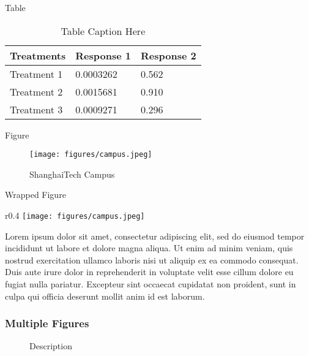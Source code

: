 \documentclass[aspectratio=169,xcolor=dvipsnames, t]{beamer}
\begin{document}
\begin{frame}{Table}
    \begin{table}
        \begin{tabular}{l l l}
            \toprule
            \textbf{Treatments} & \textbf{Response 1} & \textbf{Response 2} \\
            \midrule
            Treatment 1         & 0.0003262           & 0.562               \\
            Treatment 2         & 0.0015681           & 0.910               \\
            Treatment 3         & 0.0009271           & 0.296               \\
            \bottomrule
        \end{tabular}
        \caption{Table Caption Here}
    \end{table}
\end{frame}
\begin{frame}{Figure}
    \begin{figure}
    \texttt{[image: figures/campus.jpeg]}
    \caption{ShanghaiTech Campus}
    \end{figure}
\end{frame}
\begin{frame}{Wrapped Figure}
    \begin{wrapfigure}{r}{0.4\textwidth}
    \centering
    \texttt{[image: figures/campus.jpeg]}
    \caption{Figure Caption Here}
    \end{wrapfigure}
    Lorem ipsum dolor sit amet, consectetur adipiscing elit, sed do eiusmod tempor incididunt ut labore et dolore magna aliqua. Ut enim ad minim veniam, quis nostrud exercitation ullamco laboris nisi ut aliquip ex ea commodo consequat. Duis aute irure dolor in reprehenderit in voluptate velit esse cillum dolore eu fugiat nulla pariatur. Excepteur sint occaecat cupidatat non proident, sunt in culpa qui officia deserunt mollit anim id est laborum.
\end{frame}
\begin{frame}[fragile]
    \frametitle{Multiple Figures}
    \begin{figure}[H]
        \centering
        \hspace{1em}
        \caption{Description}
    \end{figure}
\end{frame}
\end{document}
